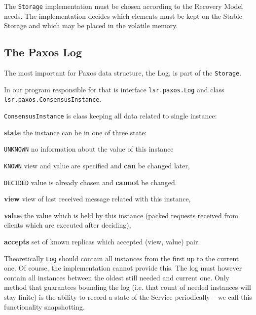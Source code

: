 \strut

The \texttt{Storage} implementation must be chosen according to the Recovery Model needs. %
The implementation decides which elements must be kept on the Stable Storage and which may be placed in the volatile memory.

\subsection{The Paxos Log}
\label{subsec:the_paxos_log}
The most important for Paxos data structure, the Log, is part of the \texttt{Storage}.

In our program responsible for that is interface \texttt{lsr.paxos.Log} and class \texttt{lsr.paxos.Con\-sen\-susInstance}.

\texttt{ConsensusInstance} is class keeping all data related to single instance:
\begin{tightList}[\setlength{\itemindent}{0pt}\setlength{\leftmargin}{2\leftmargin}]
  \item[\textbf{state}] the instance can be in one of three state:
  \begin{tightList}[\setlength{\itemindent}{0pt} \setlength{\labelwidth}{7em}]
    \item[\texttt{\tiny UNKNOWN}] no information about the value of this instance
    \item[\texttt{\tiny KNOWN}] view and value are specified and \textbf{can} be changed later,
    \item[\texttt{\tiny DECIDED}] value is already chosen and \textbf{cannot} be changed.
  \end{tightList}
  \item[\textbf{view}] view of last received message related with this instance,
  \item[\textbf{value}] the value which is held by this instance (packed requests received from clients which are executed after deciding),
  \item[\textbf{accepts}] set of known replicas which accepted (view, value) pair.
\end{tightList}

Theoretically \texttt{Log} should contain all instances from the first up to the current one. Of course, the implementation cannot provide this. The log must however contain all instances between the oldest still needed and current one. Only method that guarantees bounding the log (i.e. that count of needed instances will stay finite) is the ability to record a state of the Service periodically -- we call this functionality snapshotting. %


